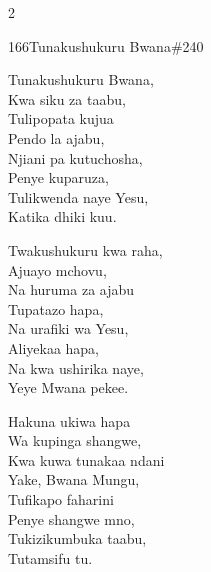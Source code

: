 \documentclass{article}
\begin{document}
\begin{multicols}{2}
\begin{hymn}{166}{Tunakushukuru Bwana}{\#240}
\begin{stanza}
Tunakushukuru Bwana,\\
Kwa siku za taabu,\\
Tulipopata kujua\\
Pendo la ajabu,\\
Njiani pa kutuchosha,\\
Penye kuparuza,\\
Tulikwenda naye Yesu,\\
Katika dhiki kuu.
\end{stanza}
\begin{stanza}
Twakushukuru kwa raha,\\
Ajuayo mchovu,\\
Na huruma za ajabu\\
Tupatazo hapa,\\
Na urafiki wa Yesu,\\
Aliyekaa hapa,\\
Na kwa ushirika naye,\\
Yeye Mwana pekee.
\end{stanza}
\begin{stanza}
Hakuna ukiwa hapa\\
Wa kupinga shangwe,\\
Kwa kuwa tunakaa ndani\\
Yake, Bwana Mungu,\\
Tufikapo faharini\\
Penye shangwe mno,\\
Tukizikumbuka taabu,\\
Tutamsifu tu.
\end{stanza}
\end{hymn}


\end{multicols}
\end{document}
